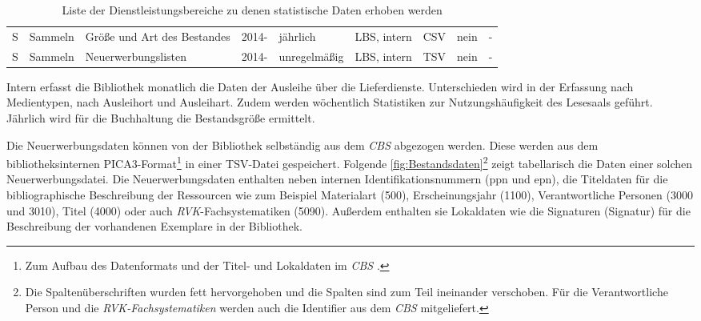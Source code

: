 \begin{table}[H]
\begin{adjustbox}{max width=\textwidth}
\begin{tabular}{p{}p{}p{}p{}p{}p{}p{}p{}p{}}
            S         &Sammeln                       & Größe und Art des Bestandes                   & 2014-             & jährlich          & LBS, intern  & CSV                       & nein  & -\\ 
            S         &Sammeln                       & Neuerwerbungslisten                           & 2014-             & unregelmäßig         & LBS, intern  & TSV                       & nein  & -\\ 
            

        \bottomrule
    \end{tabular}
    \end{adjustbox}
    \caption{%
        Liste der Dienstleistungsbereiche zu denen statistische Daten erhoben werden
    \label{tab:Statistische_Daten}
    }
     \end{table}

\endgroup


Intern erfasst die Bibliothek monatlich die Daten der Ausleihe über die Lieferdienste. Unterschieden 
wird in der Erfassung nach Medientypen, nach Ausleihort und Ausleihart. Zudem werden wöchentlich 
Statistiken zur Nutzungshäufigkeit des Lesesaals geführt. Jährlich wird für die Buchhaltung die Bestandsgröße ermittelt.

Die Neuerwerbungsdaten können von der Bibliothek selbständig aus dem \textit{\acrshort{CBS}} abgezogen werden. Diese werden aus
dem bibliotheksinternen PICA3-Format\footnote{ Zum Aufbau des Datenformats und der Titel- und Lokaldaten im \textit{\acrlong{CBS}} \cite[vgl.][4]{hebis_datenstruktur_2017}.}
in einer TSV-Datei gespeichert. Folgende \autoref{fig:Bestandsdaten}\footnote{Die Spaltenüberschriften wurden fett hervorgehoben
und die Spalten sind zum Teil ineinander verschoben. Für die Verantwortliche Person und die \textit{\acrshort{RVK}-Fachsystematiken}
werden auch die Identifier aus dem \textit{\acrshort{CBS}} mitgeliefert.} zeigt tabellarisch
die Daten einer solchen Neuerwerbungsdatei.
Die Neuerwerbungsdaten enthalten neben internen Identifikationsnummern (ppn und epn), die Titeldaten für die bibliographische Beschreibung der Ressourcen wie 
zum Beispiel Materialart (500), Erscheinungsjahr (1100), Verantwortliche Personen (3000 und 3010), Titel (4000) oder auch \textit{\acrshort{RVK}}-Fachsystematiken (5090).
Außerdem enthalten sie Lokaldaten wie die Signaturen (Signatur) für die Beschreibung der vorhandenen Exemplare in der Bibliothek.


